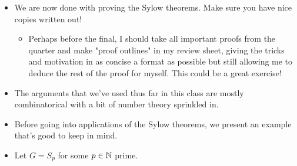 \documentclass[../notes.tex]{subfiles}
\begin{document}
\begin{itemize}
\begin{enumerate}
\begin{proof}
            Congruence should make us think, "fixed points." In this argument, we will pick up where we left off, using the same group action defined in the proof of part 1 to express the claim in the language of fixed points. We will then deduce that this latter claim is true, proving the original claim. Let's begin.\par\smallskip
            Restrict the action from part 1 to $P$. This may mean that $P\acts X$ is no longer transitive, but this will not cause any issues. Moving on, we know by the closure of subgroups that $gPg^{-1}=P$ for any $g\in P$; thus, $P$ is a fixed point of $P\acts X$. It follows by the proposition from Lecture 7.2 that $\Fixed_P(X)\equiv|X|\mod p$, and hence $n_p=|X|\equiv\Fixed_P(X)\mod p$. Thus, we are done if we can show that $\Fixed_P(X)=1$, i.e., that $P$ is the only fixed point of $X$ under $P\acts X$.\par
            Let $Q\in\Fixed_P(X)$ be arbitrary; we seek to prove that $Q=P$. Define $N:=N_G(Q)$. By definition, $Q\subset N$. Additionally, $P\subset N$: Since $Q\in\Fixed_P(X)$, $gQg^{-1}=g\cdot Q=Q$ for all $g\in P$. Hence $P,Q$ are both $p$-Sylows of $N$ (the order of $p$ dividing $|N|$ certainly [by Lagrange's Theorem] divides the order of $p$ dividing $|G|$). By Sylow II, any two $p$-Sylows are conjugate, so there exists $n\in N$ such that $nQn^{-1}=P$. Additionally, since $Q\triangleleft N$ by HW4 Q3c, we have that $nQn^{-1}=Q$. Therefore, by transitivity, $P=Q$, as desired.
        \end{proof}
    \end{enumerate}
    \item We are now done with proving the Sylow theorems. Make sure you have nice copies written out!
    \begin{itemize}
        \item Perhaps before the final, I should take all important proofs from the quarter and make "proof outlines" in my review sheet, giving the tricks and motivation in as concise a format as possible but still allowing me to deduce the rest of the proof for myself. This could be a great exercise!
    \end{itemize}
    \item The arguments that we've used thus far in this class are mostly combinatorical with a bit of number theory sprinkled in.
    \item Before going into applications of the Sylow theorems, we present an example that's good to keep in mind.
    \item Let $G=S_p$ for some $p\in\mathbb{N}$ prime.

\end{itemize}
\end{document}
